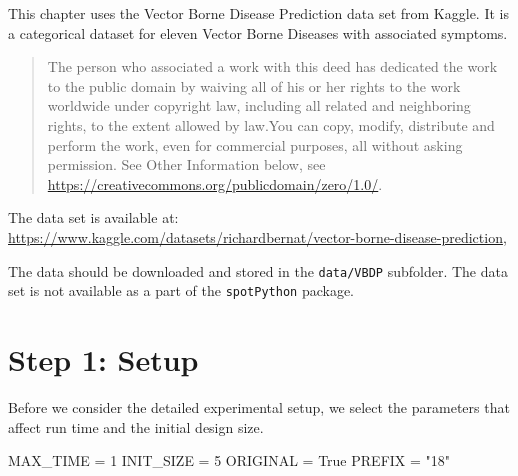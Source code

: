\documentclass[
  letterpaper,
  DIV=11,
  numbers=noendperiod]{scrreprt}
\newenvironment{Shaded}{\begin{snugshade}}{\end{snugshade}}
\newcommand{\DecValTok}[1]{\textcolor[rgb]{0.68,0.00,0.00}{#1}}
\newcommand{\NormalTok}[1]{\textcolor[rgb]{0.00,0.23,0.31}{#1}}
\newcommand{\OperatorTok}[1]{\textcolor[rgb]{0.37,0.37,0.37}{#1}}
\newcommand{\StringTok}[1]{\textcolor[rgb]{0.13,0.47,0.30}{#1}}
\newcommand{\VariableTok}[1]{\textcolor[rgb]{0.07,0.07,0.07}{#1}}
\begin{document}
\begin{tcolorbox}[enhanced jigsaw, left=2mm, title=\textcolor{quarto-callout-important-color}{\faExclamation}\hspace{0.5em}{Vector Borne Disease Prediction Data Set}, bottomrule=.15mm, titlerule=0mm, breakable, rightrule=.15mm, toprule=.15mm, coltitle=black, colbacktitle=quarto-callout-important-color!10!white, leftrule=.75mm, arc=.35mm, colframe=quarto-callout-important-color-frame, bottomtitle=1mm, colback=white, opacitybacktitle=0.6, toptitle=1mm, opacityback=0]

This chapter uses the Vector Borne Disease Prediction data set from
Kaggle. It is a categorical dataset for eleven Vector Borne Diseases
with associated symptoms.

\begin{quote}
The person who associated a work with this deed has dedicated the work
to the public domain by waiving all of his or her rights to the work
worldwide under copyright law, including all related and neighboring
rights, to the extent allowed by law.You can copy, modify, distribute
and perform the work, even for commercial purposes, all without asking
permission. See Other Information below, see
\url{https://creativecommons.org/publicdomain/zero/1.0/}.
\end{quote}

The data set is available at:
\url{https://www.kaggle.com/datasets/richardbernat/vector-borne-disease-prediction},

The data should be downloaded and stored in the \texttt{data/VBDP}
subfolder. The data set is not available as a part of the
\texttt{spotPython} package.

\end{tcolorbox}

\hypertarget{sec-setup-18}{%
\section{Step 1: Setup}\label{sec-setup-18}}

Before we consider the detailed experimental setup, we select the
parameters that affect run time and the initial design size.

\begin{Shaded}
\begin{Highlighting}[]
\NormalTok{MAX\_TIME }\OperatorTok{=} \DecValTok{1}
\NormalTok{INIT\_SIZE }\OperatorTok{=} \DecValTok{5}
\NormalTok{ORIGINAL }\OperatorTok{=} \VariableTok{True}
\NormalTok{PREFIX }\OperatorTok{=} \StringTok{"18"}
\end{Highlighting}
\end{Shaded}
\end{document}

